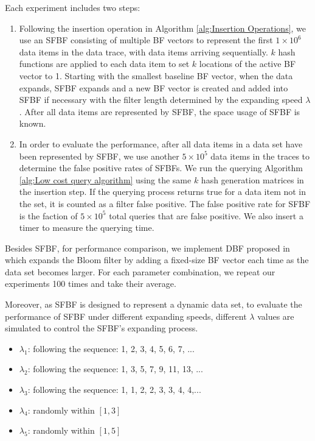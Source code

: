 \documentclass[10pt,journal,compsoc]{IEEEtran}
\newcommand{\note}[1]{{\sffamily\itshape\bfseries\uline{#1}}}
\newcommand{\DataSetSize}{$1 \times 10^6$ }
\newcommand{\SearchDataSize}{$5 \times 10^5$ }
\begin{document}
Each experiment includes two steps:
\begin{enumerate}

\item Following the insertion operation in Algorithm \ref{alg:Insertion Operations}, we use an SFBF consisting of multiple BF vectors to represent the first \DataSetSize data items in the data trace, with data items  arriving sequentially.  $k$ hash functions are applied to each data item to set $k$ locations of the active BF vector to 1. Starting with the smallest baseline BF vector, when the data expands, SFBF expands and a new BF vector is created and added into SFBF if necessary with the filter length determined by the expanding speed $\lambda$. %
    After all data items are represented by SFBF, the space usage of SFBF is known.

\item In order to evaluate the performance, after all data items in a data set have been represented by SFBF, we use another \SearchDataSize data items in the traces to determine the false positive rates of SFBFs.  We run the querying Algorithm \ref{alg:Low cost query algorithm} using the same $k$ hash generation matrices in the insertion step. If the querying process returns true for a data item not in the set, it is counted as a filter false positive. The false positive rate for SFBF is the faction of \SearchDataSize total queries that are false positive. We also insert a timer to measure the querying time.
\end{enumerate}



Besides SFBF, for performance comparison, we implement DBF proposed in~\cite{guo2006theory} which expands
the Bloom filter by adding a fixed-size BF vector each time as the data set becomes larger.  For each parameter combination, we repeat our experiments 100 times and take their average.

Moreover, as SFBF is designed to represent a dynamic data set, to evaluate the performance of SFBF under different expanding speeds, different $\lambda $ values are simulated to control the SFBF's expanding process.

\begin{itemize}
  \item $\lambda_1$: following the sequence: 1, 2, 3, 4, 5, 6, 7, ...
  \item $\lambda_2$: following the sequence: 1, 3, 5, 7, 9, 11, 13, ...
  \item $\lambda_3$: following the sequence: 1, 1, 2, 2, 3, 3, 4, 4,...
  \item $\lambda_4$: randomly  within $[1,3]$
  \item $\lambda_5$: randomly  within $[1,5]$
\end{itemize}
\end{document}

